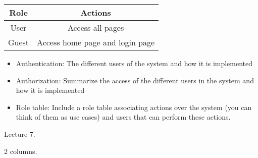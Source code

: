 \begin{tabular}{|c|c|}
    \hline
    \textbf{Role} & \textbf{Actions} \\
    \hline
    User & Access all pages \\
    \hline
    Guest & Access home page and login page \\
    \hline
\end{tabular}

\begin{itemize}
    \item Authentication: The different users of the system and how it is implemented
    \item Authorization: Summarize the access of the different users in the system and how it is implemented
    \item Role table: Include a role table associating actions over the system (you can think of them as use cases) and users that can perform these actions.
\end{itemize}

 Lecture 7.

 2 columns.
